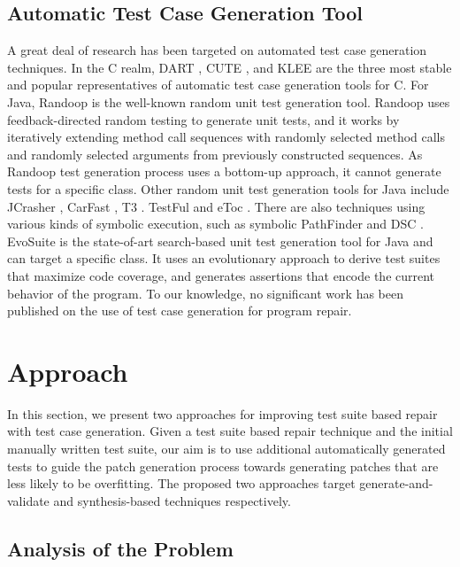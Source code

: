 \documentclass[]{sig-alternate}
\begin{document}
\subsection {Automatic Test Case Generation Tool}

A great deal of research has been targeted on automated test case generation techniques.
In the C realm, DART \cite{godefroid2005dart}, CUTE \cite{sen2005cute}, and KLEE \cite{cadar2008klee} are the three most stable and popular representatives of automatic test case generation tools for C. 
For Java, Randoop \cite{randoop} is the well-known random unit test generation tool. Randoop uses feedback-directed random testing to generate unit tests, and it works by iteratively extending method call sequences with randomly selected method calls and randomly selected arguments from previously constructed sequences. As Randoop test generation process uses a bottom-up approach, it cannot generate tests for a specific class. Other random unit test generation tools for Java include JCrasher \cite{jcrasher}, CarFast \cite{carfast}, T3 \cite{Prasetya2014}. TestFul \cite{testful} and eToc \cite{Tonella:2004:ETC:1013886.1007528}. There are also techniques using various kinds of symbolic execution, such as symbolic PathFinder \cite{Pasareanu:2010:SPS:1858996.1859035} and DSC \cite{Islam:2010:DTC:1868321.1868326}.  
EvoSuite \cite{ESECFSE11} is the state-of-art search-based unit test generation tool for Java and can target a specific class. It uses an evolutionary approach to derive test suites that maximize code coverage, and generates assertions that encode the current behavior of the program. 
To our knowledge, no significant work has been published on the use of test case generation for program repair.

\section{Approach}
\label{sec:approach}

In this section, we present two approaches for improving test suite based repair with test case generation. Given a test suite based repair technique and the initial manually written test suite, our aim is to use additional automatically generated tests to guide the patch generation process towards generating patches that are less likely to be overfitting. The proposed two approaches target generate-and-validate and synthesis-based techniques respectively. 

\subsection{Analysis of the Problem}
\end{document}
